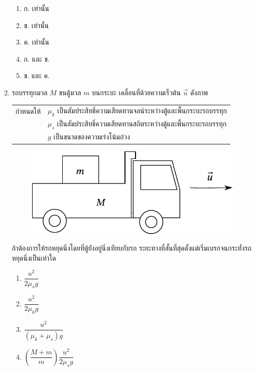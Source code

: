 \documentclass[a4paper, 12pt]{article}
\begin{document}
\begin{enumerate}
\begin{figure}[H]
\begin{minipage}[ht]{0.2\linewidth}
\begin{figure}[H]
                  \end{figure}
              \end{minipage}
          \end{figure}
          \begin{enumerate}
              \item ก. เท่านั้น
              \item ข. เท่านั้น
              \item ค. เท่านั้น
              \item ก. และ ข.
              \item ข. และ ค.
          \end{enumerate}
          \newpage
    \item รถบรรทุกมวล \(M\) ขนตู้มวล \(m\) บนกระบะ เคลื่อนที่ด้วยความเร็วต้น \(\vec{u}\) ดังภาพ \\
          \begin{tabular}{rl}
              กำหนดให้ & \(\mu_k\) เป็นสัมประสิทธิ์ความเสียดทานจลน์ระหว่างตู้และพื้นกระบะรถบรรทุก \\
                     & \(\mu_s\) เป็นสัมประสิทธิ์ความเสียดทานสถิตระหว่างตู้และพื้นกระบะรถบรรทุก \\
                     & \(g\) เป็นขนาดของความเร่งโน้มถ่วง
          \end{tabular}
          \begin{figure}[H]
              \centering
              \includegraphics[scale = 0.9]{images/6_5.pdf}
          \end{figure}
          ถ้าต้องการให้รถหยุดนิ่งโดยที่ตู้ยังอยู่นิ่งเทียบกับรถ ระยะทางที่สั้นที่สุดตั้งแต่เริ่มเบรกจนกระทั่งรถหยุดนิ่งเป็นเท่าใด
          \begin{enumerate}
              \item \(\dfrac{u^2}{2\mu_s g}\)
              \item \(\dfrac{u^2}{2\mu_k g}\)
              \item \(\dfrac{u^2}{(\mu_k+\mu_s) g}\)
              \item \(\left(\dfrac{M+m}{m}\right)\dfrac{u^2}{2\mu_s g}\)

\end{enumerate}
\end{enumerate}
\end{document}
